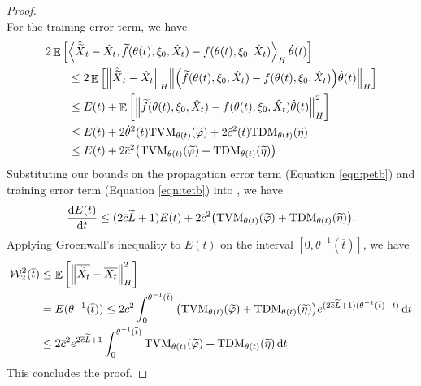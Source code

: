 \begin{proof}
\begin{equation}
  \end{equation}
  For the training error term, we have
  \begin{align}
    &2 \mathop{\mathbb{E}}\qty[\ev{ \hat{\widetilde{X}}_{t} - \hat{X}_{t}, \widetilde{f}(\theta(t), \xi_{0}, \hat{X}_{t})  - f(\theta(t), \xi_{0}, \hat{X}_{t})}_{H} \dot{\theta}(t)] \notag \\
    &\qquad \leq 2 \mathop{\mathbb{E}}\qty[\norm{ \hat{\widetilde{X}}_{t} - \hat{X}_{t}}_{H} \norm{ \qty(\widetilde{f}(\theta(t), \xi_{0}, \hat{X}_{t}) - f(\theta(t), \xi_{0}, \hat{X}_{t})) \dot{\theta}(t)}_{H}]\notag \\
    &\qquad \leq E(t) + \mathop{\mathbb{E}}\qty[\norm{ \widetilde{f}(\theta(t), \xi_{0}, \hat{X}_{t}) - f(\theta(t), \xi_{0}, \hat{X}_{t}) \dot{\theta}(t)}^{2}_{H}] \notag \\
    &\qquad \leq E(t) + 2 \dot{\theta}^{2}(t) \mathrm{TVM}_{\theta(t)}( \widetilde{\varphi}) + 2 \hat{c}^{2}(t) \mathrm{TDM}_{\theta(t)}(\widetilde{\eta}) \notag \\
    &\qquad \leq E(t) + 2 \overline{c}^{2}\qty( \mathrm{TVM}_{\theta(t)}(\widetilde{\varphi}) + \mathrm{TDM}_{\theta(t)}(\widetilde{\eta})) \label{eqn:tetb}
  \end{align}
  Substituting our bounds on the propagation error term (Equation \ref{eqn:petb}) and training error term (Equation \ref{eqn:tetb}) into , we have
  \[
    \dv{E(t)}{t}  \leq (2\overline{c} \widetilde{L} + 1) E(t) + 2\overline{c}^{2} \qty( \mathrm{TVM}_{\theta(t)}(  \widetilde{\varphi}) + \mathrm{TDM}_{\theta(t)} ( \widetilde{\eta})).
  \]
  Applying Groenwall's inequality to \(E(t)\) on the interval \([0, \theta^{-1}(\overline{t})]\), we have
  \begin{align*}
    \mathcal{W}^{2}_{2}(\overline{t}) &\leq \mathop{\mathbb{E}}\qty[ \norm{ \overline{\widetilde{X}_{t}} - \overline{X_{t}} }^{2}_{H} ] \\
    & = E(\theta^{-1}(\overline{t})) \leq 2 \overline{c}^{2} \int_{0}^{ \theta^{-1}(\overline{t})} \qty( \mathrm{TVM}_{\theta(t)}( \widetilde{\varphi} ) + \mathrm{TDM}_{\theta(t)} (\widetilde{\eta}) )e^{(2  \overline{c} \widetilde{L} + 1 )(\theta^{-1}(\overline{t}) - t) }\dd{t} \\
    &\leq 2\overline{c}^{2} e^{2 \overline{c} \widetilde{L} + 1} \int_{0}^{\theta^{-1}(\overline{t})} \mathrm{TVM}_{\theta(t)}(\widetilde{\varphi}) + \mathrm{TDM}_{\theta(t)}(\widetilde{\eta})\dd{t}
  \end{align*}
  This concludes the proof.
\end{proof}

